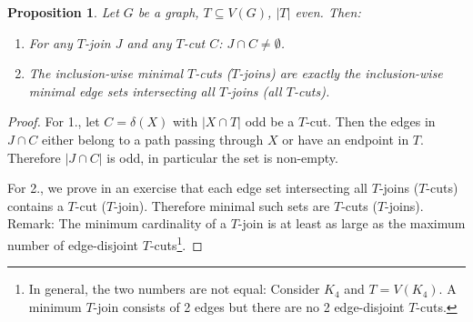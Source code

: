 \documentclass[11pt, a4paper]{article}
\newcommand{\abs}[1]{\left\lvert#1\right\rvert}
\newtheorem{prop}[theorem]{Proposition}
\theoremstyle{remark}
\theoremstyle{definition}
\begin{document}
\begin{prop}
	Let $G$ be a graph, $T\subseteq V(G)$, $\abs{T}$ even. Then:
	\begin{enumerate}
		\item
		For any $T$-join $J$ and any $T$-cut $C$: $J\cap C\neq\emptyset$.

		\item
		The inclusion-wise minimal $T$-cuts ($T$-joins) are exactly the
		inclusion-wise minimal edge sets intersecting all $T$-joins (all
		$T$-cuts).
	\end{enumerate}
\end{prop}
\begin{proof}
	For 1., let $C=\delta(X)$ with $\abs{X\cap T}$ odd be a $T$-cut. Then
	the edges in $J\cap C$ either belong to a path passing through $X$ or
	have an endpoint in $T$. Therefore $\abs{J\cap C}$ is odd, in particular
	the set is non-empty.

	For 2., we prove in an exercise that each edge set intersecting all
	$T$-joins ($T$-cuts) contains a $T$-cut ($T$-join). Therefore minimal
	such sets are $T$-cuts ($T$-joins).
	Remark: The minimum cardinality of a $T$-join is at least as large as
	the maximum number of edge-disjoint $T$-cuts\footnote{ In general,
		the two numbers are not equal: Consider $K_4$ and $T=V(K_4)$. A
		minimum $T$-join consists of 2 edges but there are no 2 edge-disjoint
		$T$-cuts. }.
\end{proof}
\end{document}
